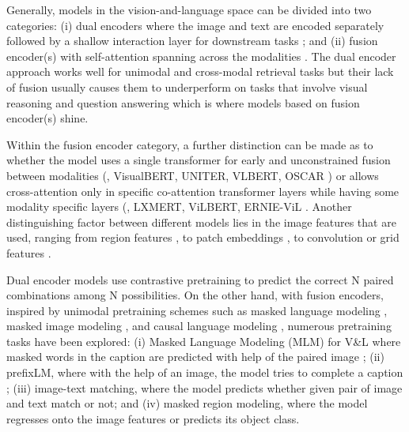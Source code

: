 \documentclass[10pt,twocolumn,letterpaper]{article}
\begin{document}
Generally, models in the vision-and-language space can be divided into two categories: (i) dual encoders where the image and text are encoded separately followed by a shallow interaction layer for downstream tasks \cite{radford2021learning,jia2021scaling}; and (ii) fusion encoder(s) with self-attention spanning across the modalities \cite{hu2020iterative,tan2019LXMERTLC,su2019vl,li2021albef, zhou2020unified, chen2020uniter, li2020oscar, li2021unimo, lu2019vilbert, li2019visualbert, lu202012, gan2020villa, zhang2021vinvl, wang2021simvlm, huang2021soho}. The dual encoder approach works well for unimodal \cite{wang2019glue, wang2019superglue} and cross-modal retrieval tasks \cite{flickr30k,coco} but their lack of fusion usually causes them to underperform on tasks that involve visual reasoning and question answering \cite{goyal2017making,kiela2020hateful,singh2019towards,sidorov2020textcaps} which is where models based on fusion encoder(s) shine.

Within the fusion encoder category, a further distinction can be made as to whether the model uses a single transformer for early and unconstrained fusion between modalities (\eg, VisualBERT, UNITER, VLBERT, OSCAR \cite{li2019visualbert, chen2020uniter, su2019vl, li2020oscar, zhou2020unified}) or allows cross-attention only in specific co-attention transformer layers while having some modality specific layers (\eg, LXMERT, ViLBERT, ERNIE-ViL \cite{tan2019LXMERTLC, lu2019vilbert, lu202012, yu2020ernie}. Another distinguishing factor between different models lies in the image features that are used, ranging from region features \cite{lu2019vilbert,li2019visualbert,zhang2021vinvl}, to patch embeddings \cite{li2021albef,kim2021vilt,wang2021simvlm}, to convolution or grid features \cite{huang2020pixelbert,jiang2020defense}.

Dual encoder models use contrastive pretraining to predict the correct N paired combinations among N possibilities. On the other hand, with fusion encoders, inspired by unimodal pretraining schemes such as masked language modeling \cite{devlin2018bert, liu2019roberta}, masked image modeling \cite{bao2021beit}, and causal language modeling \cite{radford2018improving}, numerous pretraining tasks have been explored: (i) Masked Language Modeling (MLM) for V\&L where masked words in the caption are predicted with help of the paired image \cite{li2019visualbert, lu2019vilbert, tan2019LXMERTLC}; (ii) prefixLM, where with the help of an image, the model tries to complete a caption \cite{wang2021simvlm,desai2020virtex}; (iii) image-text matching, where the model predicts whether given pair of image and text match or not; and (iv) masked region modeling, where the model regresses onto the image features or predicts its object class.
\end{document}
